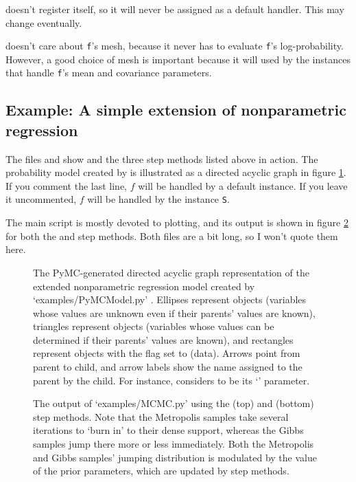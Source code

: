 \documentclass{manual}
\begin{document}
 doesn't register itself, so it will never be assigned as a default handler. This may change eventually.

 doesn't care about \texttt{f}'s mesh, because it never has to evaluate \texttt{f}'s log-probability. However, a good choice of mesh is important because it will used by the  instances that handle \texttt{f}'s mean and covariance parameters.  

\subsection{Example: A simple extension of nonparametric regression}\label{sub:BasicMCMC}
The files  and  show  and the three step methods listed above in action. The probability model created by  is illustrated as a directed acyclic graph in figure \ref{fig:unobservedModel}. If you comment the last line, $f$ will be handled by a default  instance. If you leave it uncommented, $f$ will be handled by the  instance \texttt{S}.  

The main script  is mostly devoted to plotting, and its output is shown in figure \ref{fig:MCMCOutput} for both the  and  step methods. Both files are a bit long, so I won't quote them here. 
% 

\begin{figure}
    \centering
    \caption{The PyMC-generated directed acyclic graph representation of the extended nonparametric regression model created by \textsf{`examples/PyMCModel.py'} . Ellipses represent  objects (variables whose values are unknown even if their parents' values are known), triangles represent  objects (variables whose values can be determined if their parents' values are known), and rectangles represent  objects with the  flag set to  (data). Arrows point from parent to child, and arrow labels show the name assigned to the parent by the child. For instance,  considers  to be its `' parameter.}
    \label{fig:unobservedModel}
\end{figure}

\begin{figure}
    \centering
    \caption{The output of {\sffamily `examples/MCMC.py'} using the  (top) and  (bottom) step methods. Note that the Metropolis samples take several iterations to `burn in' to their dense support, whereas the Gibbs samples jump there more or less immediately. Both the Metropolis and Gibbs samples' jumping distribution is modulated by the value of the prior parameters, which are updated by  step methods.}
    \label{fig:MCMCOutput}
\end{figure}
\end{document}
